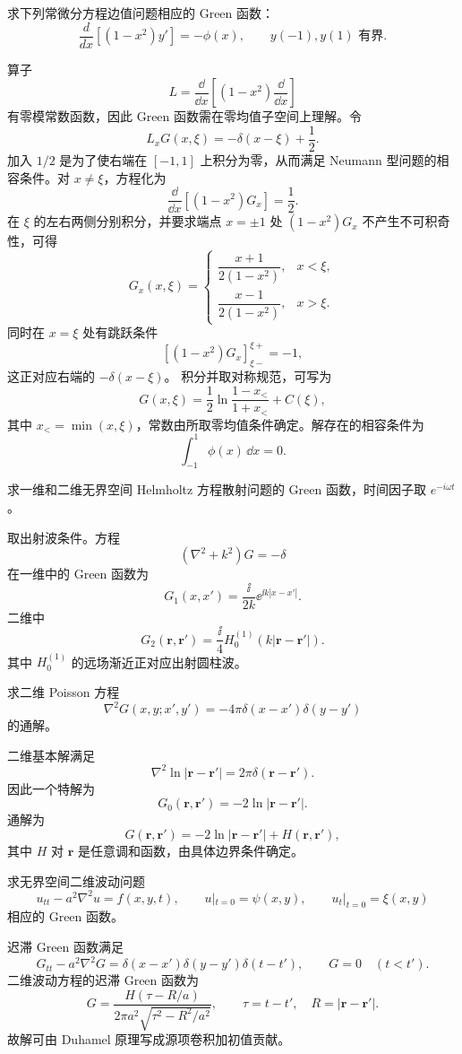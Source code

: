 \begin{question}
求下列常微分方程边值问题相应的 Green 函数：
\[
\frac d{dx}\left[(1-x^2)y'\right]=-\phi(x),\qquad
y(-1),y(1)\text{ 有界}.
\]
\begin{solution}
算子
\[
L=\frac{\dd}{\dd{x}}\left[(1-x^2)\frac{\dd}{\dd{x}}\right]
\]
有零模常数函数，因此 Green 函数需在零均值子空间上理解。令
\[
L_xG(x,\xi)=-\delta(x-\xi)+\frac12.
\]
加入 \(1/2\) 是为了使右端在 \([-1,1]\) 上积分为零，从而满足 Neumann 型问题的相容条件。对 \(x\ne\xi\)，方程化为
\[
\frac{\dd}{\dd{x}}\left[(1-x^2)G_x\right]=\frac12.
\]
在 \(\xi\) 的左右两侧分别积分，并要求端点 \(x=\pm1\) 处 \((1-x^2)G_x\) 不产生不可积奇性，可得
\[
G_x(x,\xi)=
\begin{cases}
\dfrac{x+1}{2(1-x^2)},&x<\xi,\\
\dfrac{x-1}{2(1-x^2)},&x>\xi.
\end{cases}
\]
同时在 \(x=\xi\) 处有跳跃条件
\[
\left[(1-x^2)G_x\right]_{\xi-}^{\xi+}=-1,
\]
这正对应右端的 \(-\delta(x-\xi)\)。
积分并取对称规范，可写为
\[
G(x,\xi)=\frac12\ln\frac{1-x_<}{1+x_<}
+C(\xi),
\]
其中 \(x_<=\min(x,\xi)\)，常数由所取零均值条件确定。解存在的相容条件为
\[
\int_{-1}^{1}\phi(x)\,\dd{x}=0.
\]
\end{solution}
\end{question}

\begin{question}
求一维和二维无界空间 Helmholtz 方程散射问题的 Green 函数，时间因子取 \(e^{-i\omega t}\)。
\begin{solution}
取出射波条件。方程
\[
(\nabla^2+k^2)G=-\delta
\]
在一维中的 Green 函数为
\[
G_1(x,x')=\frac{\ii}{2k}\ee^{\ii k|x-x'|}.
\]
二维中
\[
G_2(\bm r,\bm r')=\frac{\ii}{4}H_0^{(1)}(k|\bm r-\bm r'|).
\]
其中 \(H_0^{(1)}\) 的远场渐近正对应出射圆柱波。
\end{solution}
\end{question}

\begin{question}
求二维 Poisson 方程
\[
\nabla^2G(x,y;x',y')=-4\pi\delta(x-x')\delta(y-y')
\]
的通解。
\begin{solution}
二维基本解满足
\[
\nabla^2\ln|\bm r-\bm r'|=2\pi\delta(\bm r-\bm r').
\]
因此一个特解为
\[
G_0(\bm r,\bm r')=-2\ln|\bm r-\bm r'|.
\]
通解为
\[
G(\bm r,\bm r')=-2\ln|\bm r-\bm r'|+H(\bm r,\bm r'),
\]
其中 \(H\) 对 \(\bm r\) 是任意调和函数，由具体边界条件确定。
\end{solution}
\end{question}

\begin{question}
求无界空间二维波动问题
\[
u_{tt}-a^2\nabla^2u=f(x,y,t),\qquad
u|_{t=0}=\psi(x,y),\qquad u_t|_{t=0}=\xi(x,y)
\]
相应的 Green 函数。
\begin{solution}
迟滞 Green 函数满足
\[
G_{tt}-a^2\nabla^2G=\delta(x-x')\delta(y-y')\delta(t-t'),\qquad G=0\quad(t<t').
\]
二维波动方程的迟滞 Green 函数为
\[
G=\frac{H(\tau-R/a)}{2\pi a^2\sqrt{\tau^2-R^2/a^2}},
\qquad
\tau=t-t',\quad R=|\bm r-\bm r'|.
\]
故解可由 Duhamel 原理写成源项卷积加初值贡献。
\end{solution}
\end{question}

